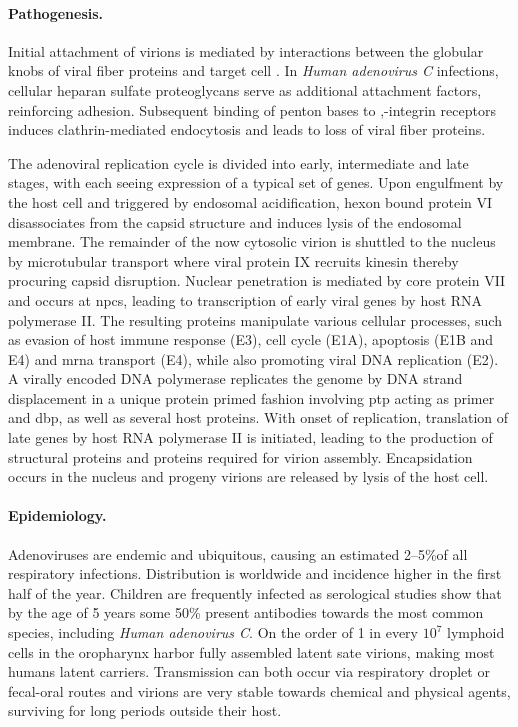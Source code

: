\paragraph{Pathogenesis.}
Initial attachment of virions is mediated by interactions between the globular knobs of viral fiber proteins and target cell . In \textit{Human adenovirus C} infections, cellular heparan sulfate proteoglycans serve as additional attachment factors, reinforcing adhesion. Subsequent binding of penton bases to \textalpha,\textbeta-integrin receptors induces clathrin-mediated endocytosis and leads to loss of viral fiber proteins.

The adenoviral replication cycle is divided into early, intermediate and late stages, with each seeing expression of a typical set of genes. Upon engulfment by the host cell and triggered by endosomal acidification, hexon bound protein VI disassociates from the capsid structure and induces lysis of the endosomal membrane. The remainder of the now cytosolic virion is shuttled to the nucleus by microtubular transport where viral protein IX recruits kinesin thereby procuring capsid disruption. Nuclear penetration is mediated by core protein VII and occurs at \glspl{npc}, leading to transcription of early viral genes by host RNA polymerase II. The resulting proteins manipulate various cellular processes, such as evasion of host immune response (E3), cell cycle (E1A), apoptosis (E1B and E4) and \gls{mrna} transport (E4), while also promoting viral DNA replication (E2). A virally encoded DNA polymerase replicates the genome by DNA strand displacement in a unique protein primed fashion involving \gls{ptp} acting as primer and \gls{dbp}, as well as several host proteins. With onset of replication, translation of late genes by host RNA polymerase II is initiated, leading to the production of structural proteins and proteins required for virion assembly. Encapsidation occurs in the nucleus and progeny virions are released by lysis of the host cell.

\paragraph{Epidemiology.}
Adenoviruses are endemic and ubiquitous, causing an estimated 2--5\%of all respiratory infections. Distribution is worldwide and incidence higher in the first half of the year. Children are frequently infected as serological studies show that by the age of 5 years some 50\% present antibodies towards the most common species, including \textit{Human adenovirus C}. On the order of 1 in every $10^7$ lymphoid cells in the oropharynx harbor fully assembled latent sate virions, making most humans latent carriers. Transmission can both occur via respiratory droplet or fecal-oral routes and virions are very stable towards chemical and physical agents, surviving for long periods outside their host.

